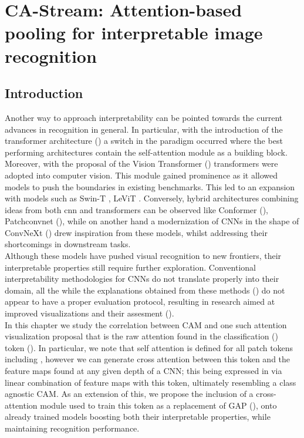 \chapter{CA-Stream: Attention-based pooling for interpretable image recognition}
\chaptertoc{}
\label{ch:castream}
\section{Introduction}
\label{sec:castream_intro}
\noindent Another way to approach interpretability can be pointed towards the current advances in 
recognition in general. In particular, with the introduction of the transformer architecture 
(\cite{vaswani2017attention}) a switch in the paradigm occurred where the best performing 
architectures contain the self-attention module as a building block. Moreover, with the proposal of 
the Vision Transformer (\cite{dosovitskiy2020image}) transformers were adopted into computer vision. 
This module gained prominence as it allowed models to push the boundaries in existing benchmarks. 
This led to an expansion with models such as Swin-T \autocite{liu2021swin}, LeViT 
\cite{graham2021levit}. Conversely, hybrid architectures combining ideas from both \gls{cnn} and 
transformers can be observed like Conformer (\cite{peng2021conformer}), Patchconvnet 
(\cite{touvron2021augmenting}), while on another hand a modernization of CNNs in the shape of 
ConvNeXt (\cite{liu2022convnet}) drew inspiration from these models, whilst addressing their 
shortcomings in downstream tasks.\\

\noindent Although these models have pushed visual recognition to new frontiers, their interpretable
 properties still require further exploration. Conventional interpretability 
methodologies for CNNs do not translate properly into their domain, all the while the explanations 
obtained from these methods (\cite{abnar2020quantifying}) do not appear to have a proper evaluation 
protocol, resulting in research aimed at improved visualizations and their assesment 
(\cite{chefer2021transformer}).\\

\noindent In this chapter we study the correlation between CAM and one such attention visualization 
proposal that is the raw attention found in the classification (\cls) token (\cite{devlin2018bert}).
In particular, we note that self attention is defined for all patch tokens including \cls, however 
we can generate cross attention between this token and the feature maps found at any given depth 
of a CNN; this being expressed in via linear combination of feature maps with this token, ultimately 
resembling a class agnostic CAM. As an extension of this, we propose the inclusion of a 
cross-attention module used to train this token as a replacement of GAP (\cite{lin2013network}), 
onto already trained models boosting  both their interpretable properties, while maintaining 
recognition performance.

